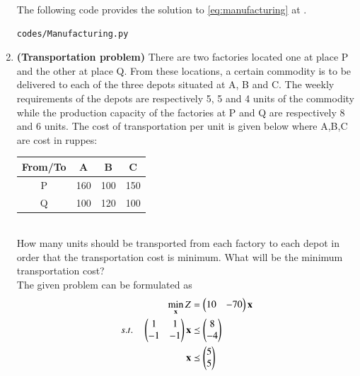 \begin{enumerate}[label=\arabic*.,ref=\thesection.\theenumi]
The following code provides the solution to \eqref{eq:manufacturing} at .
%
\begin{lstlisting}
codes/Manufacturing.py
\end{lstlisting}

\item \textbf{(Transportation problem)} There are two factories located one at
place P and the other at place Q. From these locations, a certain commodity is to be
delivered to each of the three depots situated at A, B and C. The weekly requirements
of the depots are respectively 5, 5 and 4 units of the commodity while the production
capacity of the factories at P and Q are respectively 8 and 6 units. The cost of transportation per unit is given below where A,B,C are cost in ruppes:\\
\begin{tabular}{|c|c|c|c|}
\hline
From/To & A & B & C\\
\hline
P & 160 & 100 & 150\\
\hline
Q & 100 &120 & 100\\
\hline
\end{tabular}\\
How many units should be transported from each factory to each depot in order that
the transportation cost is minimum. What will be the minimum transportation cost?
\\
\solution The given problem can be formulated as
\begin{align}
\min_{\mathbf{x}} Z &= \begin{pmatrix}10 & -70\end{pmatrix}\mathbf{x}
\\
s.t. \quad 
\begin{pmatrix}
1 & 1
\\
-1 & -1
\end{pmatrix}
\mathbf{x} & \preceq \begin{pmatrix}8\\-4\end{pmatrix}
\\
\mathbf{x} &\preceq \begin{pmatrix}5\\5\end{pmatrix}
\label{eq:transport}
\end{align}


\end{enumerate}
